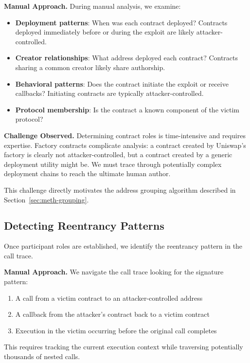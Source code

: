 \textbf{Manual Approach.} During manual analysis, we examine:
\begin{itemize}
    \item \textbf{Deployment patterns}: When was each contract deployed? Contracts deployed immediately before or during the exploit are likely attacker-controlled.
    \item \textbf{Creator relationships}: What address deployed each contract? Contracts sharing a common creator likely share authorship.
    \item \textbf{Behavioral patterns}: Does the contract initiate the exploit or receive callbacks? Initiating contracts are typically attacker-controlled.
    \item \textbf{Protocol membership}: Is the contract a known component of the victim protocol?
\end{itemize}

\textbf{Challenge Observed.} Determining contract roles is time-intensive and requires expertise. Factory contracts complicate analysis: a contract created by Uniswap's factory is clearly not attacker-controlled, but a contract created by a generic deployment utility might be. We must trace through potentially complex deployment chains to reach the ultimate human author.

This challenge directly motivates the address grouping algorithm described in Section~\ref{sec:meth-grouping}.

\subsection{Detecting Reentrancy Patterns}
\label{sec:meth-patterns}

Once participant roles are established, we identify the reentrancy pattern in the call trace.

\textbf{Manual Approach.} We navigate the call trace looking for the signature pattern:
\begin{enumerate}
    \item A call from a victim contract to an attacker-controlled address
    \item A callback from the attacker's contract back to a victim contract
    \item Execution in the victim occurring before the original call completes
\end{enumerate}

This requires tracking the current execution context while traversing potentially thousands of nested calls.

